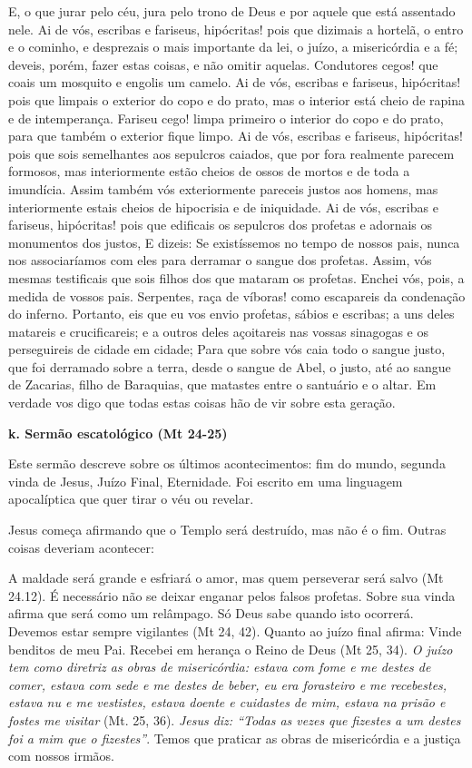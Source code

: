 \documentclass[
]{book}
\begin{document}
E, o que jurar pelo céu, jura pelo trono de Deus e por aquele que está assentado nele. Ai de vós, escribas e fariseus, hipócritas! pois que dizimais a hortelã, o entro e o cominho, e desprezais o mais importante da lei, o juízo, a misericórdia e a fé; deveis, porém, fazer estas coisas, e não omitir aquelas. Condutores cegos! que coais um mosquito e engolis um camelo. Ai de vós, escribas e fariseus, hipócritas! pois que limpais o exterior do copo e do prato, mas o interior está cheio de rapina e de intemperança. Fariseu cego! limpa primeiro o interior do copo e do prato, para que também o exterior fique limpo. Ai de vós, escribas e fariseus, hipócritas! pois que sois semelhantes aos sepulcros caiados, que por fora realmente parecem formosos, mas interiormente estão cheios de ossos de mortos e de toda a imundícia. Assim também vós exteriormente pareceis justos aos homens, mas interiormente estais cheios de hipocrisia e de iniquidade. Ai de vós, escribas e fariseus, hipócritas! pois que edificais os sepulcros dos profetas e adornais os monumentos dos justos, E dizeis: Se existíssemos no tempo de nossos pais, nunca nos associaríamos com eles para derramar o sangue dos profetas. Assim, vós mesmas testificais que sois filhos dos que mataram os profetas. Enchei vós, pois, a medida de vossos pais. Serpentes, raça de víboras! como escapareis da condenação do inferno. Portanto, eis que eu vos envio profetas, sábios e escribas; a uns deles matareis e crucificareis; e a outros deles açoitareis nas vossas sinagogas e os perseguireis de cidade em cidade; Para que sobre vós caia todo o sangue justo, que foi derramado sobre a terra, desde o sangue de Abel, o justo, até ao sangue de Zacarias, filho de Baraquias, que matastes entre o santuário e o altar. Em verdade vos digo que todas estas coisas hão de vir sobre esta geração.

\textbf{k. Sermão escatológico (Mt 24-25)}

Este sermão descreve sobre os últimos acontecimentos: fim do mundo, segunda vinda de Jesus, Juízo Final, Eternidade. Foi escrito em uma linguagem apocalíptica que quer tirar o véu ou revelar.

Jesus começa afirmando que o Templo será destruído, mas não é o fim. Outras coisas deveriam acontecer:

A maldade será grande e esfriará o amor, mas quem perseverar será salvo (Mt 24.12). É necessário não se deixar enganar pelos falsos profetas. Sobre sua vinda afirma que será como um relâmpago. Só Deus sabe quando isto ocorrerá. Devemos estar sempre vigilantes (Mt 24, 42). Quanto ao juízo final afirma: Vinde benditos de meu Pai. Recebei em herança o Reino de Deus (Mt 25, 34). \emph{O juízo tem como diretriz as obras de misericórdia: estava com fome e me destes de comer, estava com sede e me destes de beber, eu era forasteiro e me recebestes, estava nu e me vestistes, estava doente e cuidastes de mim, estava na prisão e fostes me visitar} (Mt. 25, 36). \emph{Jesus diz: ``Todas as vezes que fizestes a um destes foi a mim que o fizestes''}. Temos que praticar as obras de misericórdia e a justiça com nossos irmãos.
\end{document}

